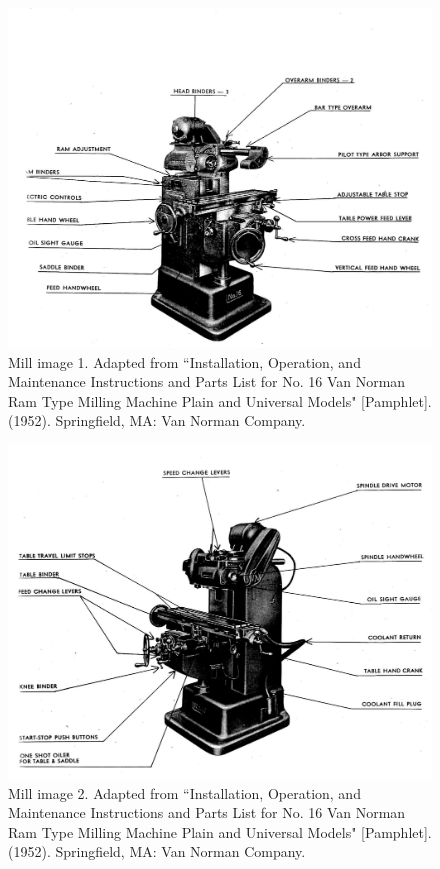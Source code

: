 \documentclass[12pt,twoside,letterpaper]{article}
\begin{document}
\begin{figure}[H]
	\centering
		\includegraphics[width=5in]{diagram1}
\caption{Mill image 1. Adapted from ``Installation, Operation, and Maintenance Instructions and Parts List for No. 16 Van Norman Ram Type Milling Machine Plain and Universal Models" [Pamphlet]. (1952). Springfield, MA: Van Norman Company. }
\end{figure}

\begin{figure}[H]
	\centering
\includegraphics[width=5in]{diagram2}
\caption{Mill image 2. Adapted from ``Installation, Operation, and Maintenance Instructions and Parts List for No. 16 Van Norman Ram Type Milling Machine Plain and Universal Models" [Pamphlet]. (1952). Springfield, MA: Van Norman Company. }
\end{figure}
\end{document}
